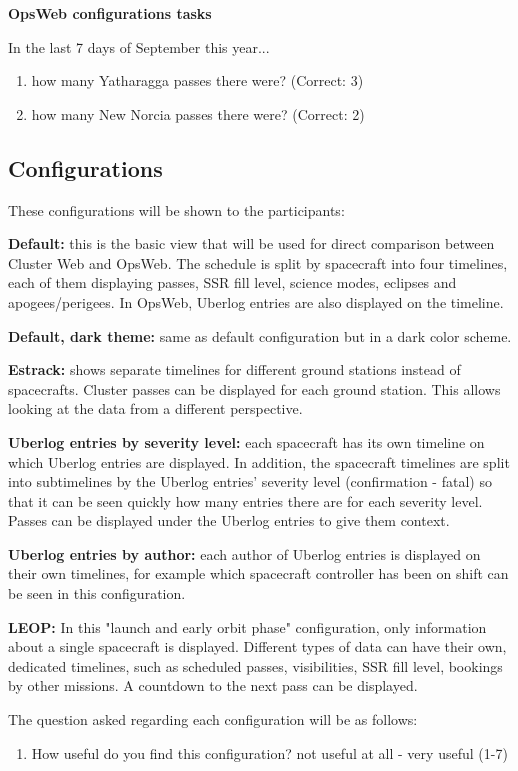 \textbf{OpsWeb configurations tasks}


In the last 7 days of September this year...
\begin{enumerate}
\item how many Yatharagga passes there were? (Correct: 3)
\item how many New Norcia passes there were? (Correct: 2)
\end{enumerate}

\subsection{Configurations} \label{configurations_section}
These configurations will be shown to the participants:

\textbf{Default:} this is the basic view that will be used for direct comparison between Cluster Web and OpsWeb. The schedule is split by spacecraft into four timelines, each of them displaying passes, SSR fill level, science modes, eclipses and apogees/perigees. In OpsWeb, Uberlog entries are also displayed on the timeline.

\textbf{Default, dark theme:} same as default configuration but in a dark color scheme.

\textbf{Estrack:} shows separate timelines for different ground stations instead of spacecrafts. Cluster passes can be displayed for each ground station. This allows looking at the data from a different perspective.

\textbf{Uberlog entries by severity level:} each spacecraft has its own timeline on which Uberlog entries are displayed. In addition, the spacecraft timelines are split into subtimelines by the Uberlog entries' severity level (confirmation - fatal) so that it can be seen quickly how many entries there are for each severity level. Passes can be displayed under the Uberlog entries to give them context.

\textbf{Uberlog entries by author:} each author of Uberlog entries is displayed on their own timelines, for example which spacecraft controller has been on shift can be seen in this configuration.

\textbf{LEOP:} In this "launch and early orbit phase" configuration, only information about a single spacecraft is displayed. Different types of data can have their own, dedicated timelines, such as scheduled passes, visibilities, SSR fill level, bookings by other missions. A countdown to the next pass can be displayed.

The question asked regarding each configuration will be as follows:
\begin{enumerate}
\item How useful do you find this configuration? not useful at all - very useful (1-7)
\end{enumerate}

